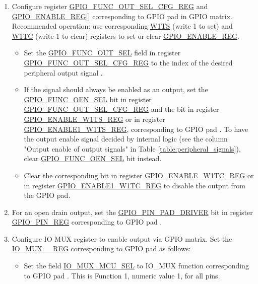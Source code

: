 \documentclass[main\_\_EN.tex]{subfiles}
\begin{document}
\begin{enumerate}
    \item Configure register \hyperref[regdesc:GPIOFUNCNOUTSELCFGREG]{GPIO\_FUNC\_OUT\_SEL\_CFG\_REG} and \hyperref[regdesc:GPIOENABLEREG]{GPIO\_ENABLE\_REG}[] corresponding to GPIO pad  in GPIO matrix. Recommended operation: use corresponding \hyperref[regdesc:GPIOENABLEW1TSREG]{W1TS} (write 1 to set) and \hyperref[regdesc:GPIOENABLEW1TCREG]{W1TC} (write 1 to clear) registers to set or clear \hyperref[regdesc:GPIOENABLEREG]{GPIO\_ENABLE\_REG}.
    \begin{itemize}
        \item Set the \hyperref[fielddesc:GPIOFUNCNOUTSEL]{GPIO\_FUNC\_OUT\_SEL} field in register \hyperref[regdesc:GPIOFUNCNOUTSELCFGREG]{GPIO\_FUNC\_OUT\_SEL\_CFG\_REG} to the index of the desired peripheral output signal .
        \item If the signal should always be enabled as an output, set the \hyperref[fielddesc:GPIOFUNCNOENSEL]{GPIO\_FUNC\_OEN\_SEL} bit in register \hyperref[regdesc:GPIOFUNCNOUTSELCFGREG]{GPIO\_FUNC\_OUT\_SEL\_CFG\_REG} and the bit in register \hyperref[regdesc:GPIOENABLEW1TSREG]{GPIO\_ENABLE\_W1TS\_REG} or in register \hyperref[regdesc:GPIOENABLE1W1TSREG]{GPIO\_ENABLE1\_W1TS\_REG}, corresponding to GPIO pad . To have the output enable signal decided by internal logic (see the column "Output enable of output signals" in Table \ref{table:peripheral_signals}), clear \hyperref[fielddesc:GPIOFUNCNOENSEL]{GPIO\_FUNC\_OEN\_SEL} bit instead.
       \item Clear the corresponding bit in register \hyperref[regdesc:GPIOENABLEW1TCREG]{GPIO\_ENABLE\_W1TC\_REG} or in register \hyperref[regdesc:GPIOENABLE1W1TCREG]{GPIO\_ENABLE1\_W1TC\_REG} to disable the output from the GPIO pad.
    \end{itemize}
    \item For an open drain output, set the \hyperref[fielddesc:GPIOPINNPADDRIVER]{GPIO\_PIN\_PAD\_DRIVER} bit in register \hyperref[regdesc:GPIOPINNREG]{GPIO\_PIN\_REG} corresponding to GPIO pad .
    \item Configure IO MUX register to enable output via GPIO matrix. Set the \hyperref[regdesc:IOMUXnREG]{IO\_MUX\_\_REG} corresponding to GPIO pad  as follows:
    \begin{itemize}
        \item Set the field \hyperref[fielddesc:IOMUXMCUSEL]{IO\_MUX\_MCU\_SEL} to IO\_MUX function corresponding to GPIO pad . This is Function 1, numeric value 1, for all pins.

\end{itemize}
\end{enumerate}
\end{document}
